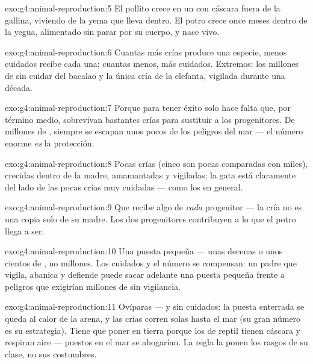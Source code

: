 \begin{solution}{exo:g4:animal-reproduction:5}
El pollito crece en un  con cáscara fuera de la gallina, viviendo
de la yema que lleva dentro. El potro crece once meses dentro de la
yegua, alimentado sin parar por su cuerpo, y nace vivo.
\end{solution}

\begin{solution}{exo:g4:animal-reproduction:6}
Cuantas más crías produce una especie, menos cuidados recibe cada una;
cuantas menos, más cuidados. Extremos: los millones de  sin
cuidar del bacalao y la única cría de la elefanta, vigilada durante una
década.
\end{solution}

\begin{solution}{exo:g4:animal-reproduction:7}
Porque para tener éxito solo hace falta que, por término medio,
sobrevivan bastantes crías para sustituir a los progenitores. De
millones de , siempre se escapan unos pocos de los peligros del
mar --- el número enorme \emph{es} la protección.
\end{solution}

\begin{solution}{exo:g4:animal-reproduction:8}
Pocas crías (cinco son pocas comparadas con miles), crecidas dentro de
la madre, amamantadas y vigiladas: la gata está claramente del lado de
las pocas crías muy cuidadas --- como los  en general.
\end{solution}

\begin{solution}{exo:g4:animal-reproduction:9}
Que recibe algo de \emph{cada} progenitor --- la cría no es una copia
solo de su madre. Los dos progenitores contribuyen a lo que el potro
llega a ser.
\end{solution}

\begin{solution}{exo:g4:animal-reproduction:10}
Una puesta pequeña --- unas decenas o unos cientos de , no
millones. Los cuidados y el número se compensan: un padre que vigila,
abanica y defiende puede sacar adelante una puesta pequeña frente a
peligros que exigirían millones de  sin vigilancia.
\end{solution}

\begin{solution}{exo:g4:animal-reproduction:11}
Ovíparas --- y sin cuidados: la puesta enterrada se queda al calor de
la arena, y las crías corren solas hasta el mar (su gran número es su
estrategia). Tiene que poner en tierra porque los  de reptil
tienen cáscara y respiran aire --- puestos en el mar se ahogarían. La
regla la ponen los rasgos de su clase, no sus costumbres.
\end{solution}
